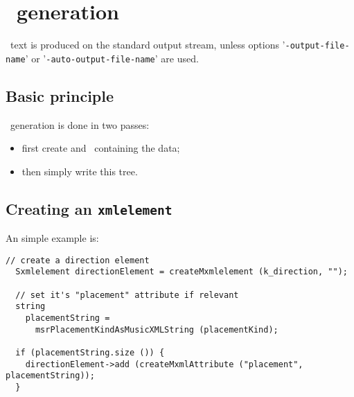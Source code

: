 
\chapter{\mxml\ generation}

\mxml\ text is produced on the standard output stream, unless options '{\tt -output-file-name}' or '{\tt -auto-output-file-name}' are used.


\section{Basic principle} \label{musicxmlGeneration}

\mxml\ generation is done in two passes:
\begin{itemize}
\item first create and \mxsrRepr\ containing the data;
\item then simply write this tree.
\end{itemize}


\section{Creating an {\tt xmlelement}}

An simple example is:
\begin{lstlisting}[language=CPlusPlus]
  // create a direction element
  Sxmlelement directionElement = createMxmlelement (k_direction, "");

  // set it's "placement" attribute if relevant
  string
    placementString =
      msrPlacementKindAsMusicXMLString (placementKind);

  if (placementString.size ()) {
    directionElement->add (createMxmlAttribute ("placement",  placementString));
  }
\end{lstlisting}

